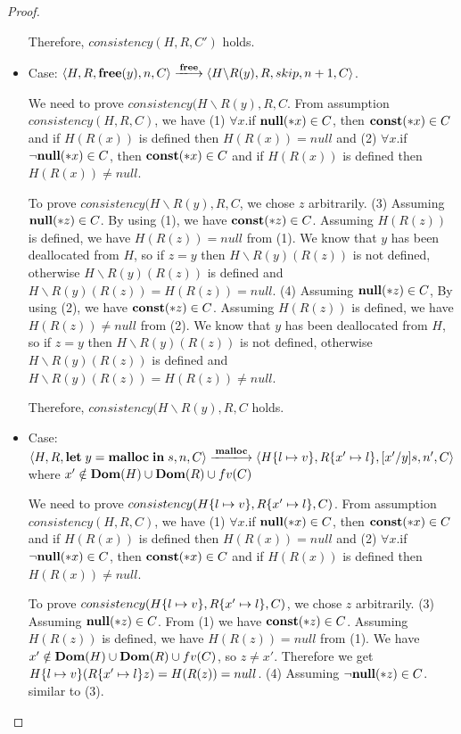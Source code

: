 \begin{proof}
\begin{itemize}
    Therefore, \(consistency(H, R, C')\) holds.

  \item Case: \(\langle H, R, \Free(y), n, C \rangle \xlongrightarrow{\Free}
    \langle H\backslash R(y), R, skip, n+1, C  \rangle \).

    We need to prove \(consistency(H\backslash R(y), R, C\). From
    assumption \(consistency(H, R, C)\), we have (1) \(\forall x\).if
    \({\bf null}(*x) \in C\), then \(\mathbf{const}(*x) \in C\) and if \(H(R(x))\) is
    defined then \(H(R(x)) = null\) and (2) \(\forall x\).if
    \(\neg{\bf null}(*x) \in C\), then \(\mathbf{const}(*x) \in C\) and if \(H(R(x))\) is
    defined then \(H(R(x)) \ne null\).

    To prove \(consistency(H\backslash R(y), R, C\), we chose \(z\)
    arbitrarily. (3) Assuming \(\mathbf{null}(*z) \in C\). By using (1), we
    have \(\mathbf{const}(*z) \in C\). Assuming \(H(R(z))\) is defined, we have
    \(H(R(z)) = null\) from (1). We know that \(y\) has been
    deallocated from \(H\), so if \( z = y \) then \(H\backslash
    R(y)(R(z))\) is not defined, otherwise \(H\backslash R(y)(R(z))\)
    is defined and \(H\backslash R(y)(R(z)) = H(R(z)) = null\). (4)
    Assuming \(\mathbf{null}(*z) \in C\), By using (2), we have \(\mathbf{const}(*z)
    \in C\). Assuming \(H(R(z))\) is defined, we have \(H(R(z)) \ne
    null\) from (2). We know that \(y\) has been deallocated from
    \(H\), so if \( z = y \) then \(H\backslash R(y)(R(z))\) is not
    defined, otherwise \(H\backslash R(y)(R(z))\) is defined and
    \(H\backslash R(y)(R(z)) = H(R(z)) \ne null\).

    Therefore, \(consistency(H\backslash R(y), R, C\) holds.
        
\item Case: \(\langle H, R, \LET y = \Malloc \; \IN s, n, C \rangle
  \xlongrightarrow{\Malloc} \langle H\set{l \mapsto v}, R\set{x'
    \mapsto l}, [x'/y]s, n', C \rangle \) where \(x' \notin
  \mathbf{Dom}(H)\cup\mathbf{Dom}(R)\cup fv(C) \)

    We need to prove \(consistency(H\{l \mapsto v\}, R\{x'
      \mapsto l\}, C )\). From assumption \(consistency(H, R, C)\), we
    have (1) \(\forall x\).if \({\bf null}(*x) \in C\), then \(\mathbf{const}(*x) \in
    C\) and if \(H(R(x))\) is defined then \(H(R(x)) = null\) and (2)
    \(\forall x\).if \(\neg{\bf null}(*x) \in C\), then \(\mathbf{const}(*x) \in C\) and
    if \(H(R(x))\) is defined then \(H(R(x)) \ne null\).

    To prove \(consistency(H\{l \mapsto v\}, R\{x' \mapsto l\}, C
    )\), we chose \(z\) arbitrarily. (3) Assuming \(\mathbf{null}(*z) \in
    C\). From (1) we have \(\mathbf{const}(*z) \in C\). Assuming \(H(R(z))\) is
    defined, we have \(H(R(z)) = null \) from (1). We have \(x' \notin
    \mathbf{Dom}(H)\cup\mathbf{Dom}(R)\cup fv(C) \), so \(z \ne x'\). Therefore we get
    \(H\{l \mapsto v\}(R\{x' \mapsto l\}z) = H(R(z)) = null\). (4)
    Assuming \(\neg\mathbf{null}(*z) \in C\). similar to (3).
    

\end{itemize}
\end{proof}
